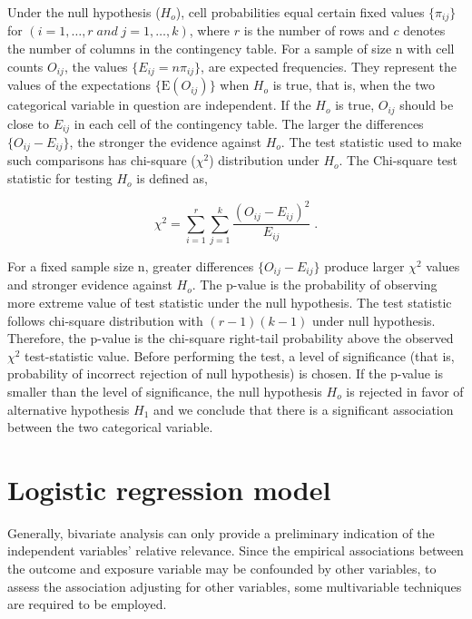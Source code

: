 \documentclass[
  12pt,
  oneside]{report}
\begin{document}
Under the null hypothesis (\(H_o\)), cell probabilities equal certain fixed values \(\{\pi_{ij}\}\) for \((i = 1, \dots, r \; and \; j = 1, \dots, k)\), where \(r\) is the number of rows and \(c\) denotes the number of columns in the contingency table.
For a sample of size n with cell counts \(O_{ij}\), the values \(\{E_{ij} = n\pi_{ij}\}\), are expected frequencies. They represent the values of the expectations \(\{\mathrm{E}(O_{ij})\}\) when \(H_o\) is true, that is, when the two categorical variable in question are independent. If the \(H_o\) is true, \(O_{ij}\) should be close to \(E_{ij}\) in each cell of the contingency table. The larger the differences \(\{O_{ij} - E_{ij}\}\), the stronger the evidence against \(H_o\). The test statistic used to make such comparisons has chi-square (\(\chi^2\)) distribution under \(H_o\). The Chi-square test statistic for testing \(H_o\) is defined as,

\[
\chi^{2} = \sum_{i=1}^{r}\sum_{j=1}^{k}\frac{\left(O_{ij} - E_{ij}\right)^{2}}{E_{ij}} \; .
\]

For a fixed sample size n, greater differences \(\{O_{ij} - E_{ij}\}\) produce larger \(\chi^2\) values and stronger evidence against \(H_o\). The p-value is the probability of observing more extreme value of test statistic under the null hypothesis. The test statistic follows chi-square distribution with \((r-1)(k-1)\) under null hypothesis. Therefore, the p-value is the chi-square right-tail probability above the
observed \(\chi^2\) test-statistic value. Before performing the test, a level of significance (that is, probability of incorrect rejection of null hypothesis) is chosen. If the p-value is smaller than the level of significance, the null hypothesis \(H_o\) is rejected in favor of alternative hypothesis \(H_1\) and we conclude that there is a significant association between the two categorical variable.

\hypertarget{logistic-regression-model}{%
\section{Logistic regression model}\label{logistic-regression-model}}

Generally, bivariate analysis can only provide a preliminary indication of the independent variables' relative relevance. Since the empirical associations between the outcome and exposure variable may be confounded by other variables, to assess the association adjusting for other variables, some multivariable techniques are required to be employed.
\end{document}
